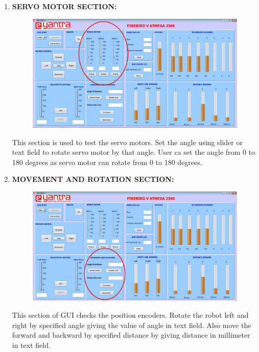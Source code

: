 \documentclass{article}
\begin{document}
\begin{enumerate}
		\item \textbf{SERVO MOTOR SECTION:} \\
		\begin{figure}[h]
			\begin{center}
				\includegraphics[scale=0.4]{servomotor.png}
			\end{center}
		\end{figure} 
		This section is used to test the servo motors. Set the angle using slider or text field to rotate servo motor by that angle. User ca set the angle from 0 to 180 degrees as servo motor can rotate from 0 to 180 degrees.
		\newpage
		\item \textbf{MOVEMENT AND ROTATION SECTION:} \\
		\begin{figure}[h]
			\begin{center}
				\includegraphics[scale=0.4]{movement_rotation.png}
			\end{center}
		\end{figure}
		This section of GUI checks the position encoders. Rotate the robot left and right by specified angle giving the value of angle in text field. Also move the forward and backward by specified distance by giving distance in millimeter in text field.

\end{enumerate}
\end{document}
